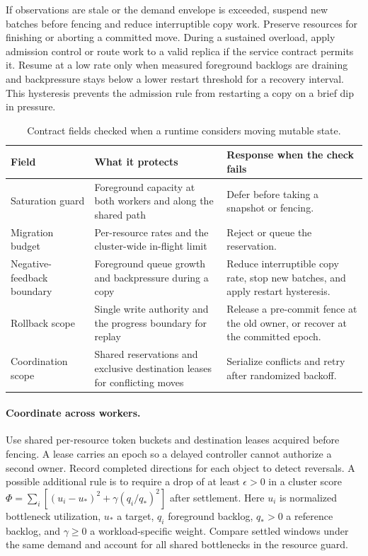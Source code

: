 \documentclass[manuscript]{acmart}
\begin{document}
If observations are stale or the demand envelope is exceeded, suspend new batches before fencing and reduce interruptible copy work. Preserve resources for finishing or aborting a committed move. During a sustained overload, apply admission control or route work to a valid replica if the service contract permits it. Resume at a low rate only when measured foreground backlogs are draining and backpressure stays below a lower restart threshold for a recovery interval. This hysteresis prevents the admission rule from restarting a copy on a brief dip in pressure.

\begin{table}[t]
\small
\setlength{\tabcolsep}{4pt}
\caption{Contract fields checked when a runtime considers moving mutable state.}
\label{tab:migration-contract}
\begin{tabular}{@{}p{}p{}p{}@{}}
\toprule
Field & What it protects & Response when the check fails \\
\midrule
Saturation guard & Foreground capacity at both workers and along the shared path & Defer before taking a snapshot or fencing. \\
Migration budget & Per-resource rates and the cluster-wide in-flight limit & Reject or queue the reservation. \\
Negative-feedback boundary & Foreground queue growth and backpressure during a copy & Reduce interruptible copy rate, stop new batches, and apply restart hysteresis. \\
Rollback scope & Single write authority and the progress boundary for replay & Release a pre-commit fence at the old owner, or recover at the committed epoch. \\
Coordination scope & Shared reservations and exclusive destination leases for conflicting moves & Serialize conflicts and retry after randomized backoff. \\
\bottomrule
\end{tabular}
\end{table}

\paragraph{Coordinate across workers.}
Use shared per-resource token buckets and destination leases acquired before fencing. A lease carries an epoch so a delayed controller cannot authorize a second owner. Record completed directions for each object to detect reversals. A possible additional rule is to require a drop of at least \(\epsilon>0\) in a cluster score \(\Phi=\sum_i[(u_i-u_*)^2+\gamma(q_i/q_*)^2]\) after settlement. Here \(u_i\) is normalized bottleneck utilization, \(u_*\) a target, \(q_i\) foreground backlog, \(q_*>0\) a reference backlog, and \(\gamma\geq0\) a workload-specific weight. Compare settled windows under the same demand and account for all shared bottlenecks in the resource guard.
\end{document}
